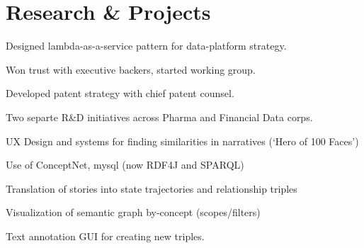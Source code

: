\documentclass[letterpaper]{deedy-resume} %
\begin{document}
\begin{minipage}[t]{0.66\textwidth} %


\section{Research \& Projects}




\vspace{\topsep} %
\begin{tightitemize}
\item Designed lambda-as-a-service pattern for data-platform strategy.
\item Won trust with executive backers, started working group.
\item Developed patent strategy with chief patent counsel.
\item Two separte R\&D initiatives across Pharma and Financial Data corps.
\end{tightitemize}

\sectionspace %




UX Design and systems for finding similarities in narratives (‘Hero of 100 Faces’)
\begin{tightitemize}
\item Use of ConceptNet, mysql (now RDF4J and SPARQL)
\item Translation of stories into state trajectories and relationship triples
\item Visualization of semantic graph by-concept (scopes/filters)
\item Text annotation GUI for creating new triples.
\end{tightitemize}

\sectionspace %



\end{minipage}
\end{document}
